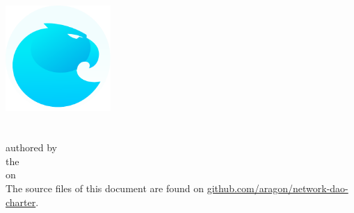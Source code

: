 
\begin{titlepage}	
	\begin{center}
		\vspace*{2cm}
		{\includegraphics[width=4cm]{graphics/Aragon-Logo.pdf}}\\[2mm]
		{\Huge \textbf{\@title}}\\[2mm]
		{\Large \texttt{\@subtitle}}\\[4mm]
		{\large authored by}\\
		{\large the \@author}\\
		{\large on \@date}\\
		\vspace{\fill}
		The source files of this document are found on \href{https://github.com/aragon/network-dao-charter}{github.com/aragon/network-dao-charter}.
	\end{center}
\end{titlepage} 

\tableofcontents
\clearpage
